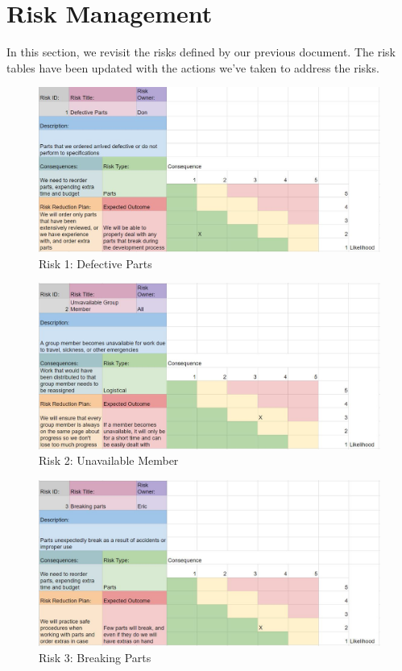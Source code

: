 
\section{Risk Management}
\label{sec:risk_management}


In this section, we revisit the risks defined by our previous document. The risk tables have been updated with the actions we've taken to address the risks.\

\begin{figure}[h!]
\centering
\includegraphics[width=0.98\columnwidth]{risks/risk1.JPG}
\caption{Risk 1: Defective Parts}
\label{fig:risk1}
\end{figure}
\begin{figure}[h!]
\centering
\includegraphics[width=0.98\columnwidth]{risks/risk2.JPG}
\caption{Risk 2: Unavailable Member}
\label{fig:risk2}
\end{figure}
\begin{figure}[h!]
\centering
\includegraphics[width=0.98\columnwidth]{risks/risk3.JPG}
\caption{Risk 3: Breaking Parts}
\label{fig:risk3}
\end{figure}
